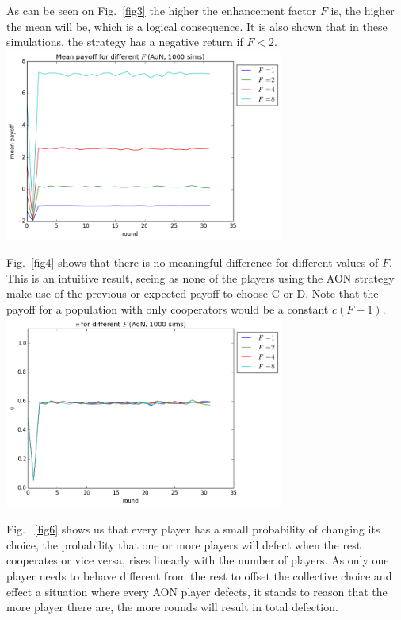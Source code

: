 \documentclass[letterpaper]{article}
\begin{document}


As can be seen on Fig.~\ref{fig3} the higher the enhancement factor $F$ is, the higher the mean will be, which is a logical consequence. It is also shown that in these simulations, the strategy has a negative return if $F<2$.
\includegraphics[width=3.6in,angle=0]{img/meanpayoff_F_aon.png}
\label{fig3}
\vspace{5 mm}

Fig.~\ref{fig4} shows that there is no meaningful difference for different values of $F$. This is an intuitive result, seeing as none of the players using the AON strategy make use of the previous or expected payoff to choose C or D. Note that the payoff for a population with only cooperators would be a constant $c(F-1)$.
\includegraphics[width=3.6in,angle=0]{img/cfraction_F_aon.png}
\label{fig4}
\vspace{5 mm}

Fig. ~\ref{fig6} shows us that every player has a small probability of changing its choice, the probability that one or more players will defect when the rest cooperates or vice versa, rises linearly with the number of players. As only one player needs to behave different from the rest to offset the collective choice and effect a situation where every AON player defects, it stands to reason that the more player there are, the more rounds will result in total defection.
\vspace{5 mm}
\end{document}

